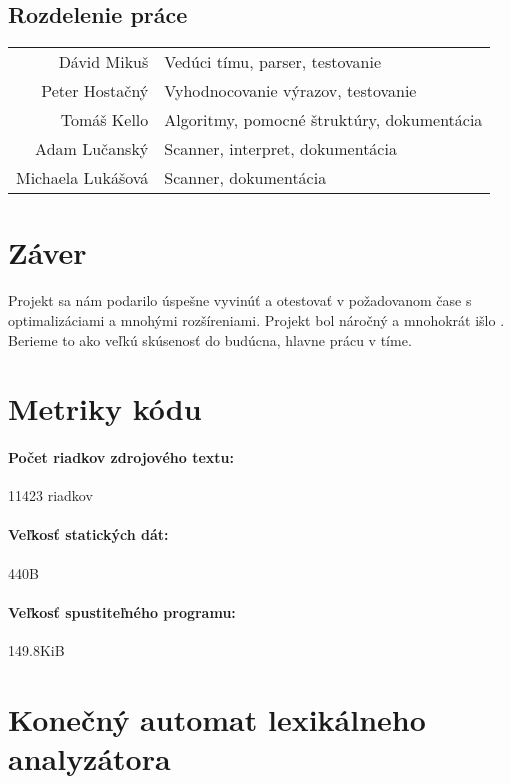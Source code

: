 \documentclass[12pt,a4paper,titlepage,final]{article}
\begin{document}
\subsection{Rozdelenie práce}
\begin{table}[H]
	\centering
	\begin{tabular}{rl}
		Dávid Mikuš        & Vedúci tímu, parser, testovanie \\
		Peter Hostačný     & Vyhodnocovanie výrazov, testovanie \\
		Tomáš Kello        & Algoritmy, pomocné štruktúry, dokumentácia \\
		Adam Lučanský      & Scanner, interpret, dokumentácia \\
		Michaela Lukášová  & Scanner, dokumentácia
	\end{tabular}
\end{table}

\section{Záver}
Projekt sa nám podarilo úspešne vyvinúť a otestovať v požadovanom čase
s optimalizáciami a mnohými rozšíreniami. Projekt bol náročný a mnohokrát 
išlo . Berieme to ako veľkú skúsenosť do budúcna, hlavne
prácu v tíme.


\appendix

\section{Metriky kódu} \label{metriky}
\paragraph{Počet riadkov zdrojového textu:} 11423 riadkov
\paragraph{Veľkosť statických dát:} 440B
\paragraph{Veľkosť spustiteľného programu:} 149.8KiB

\section{Konečný automat lexikálneho analyzátora}\label{chap:scanner}
\end{document}
